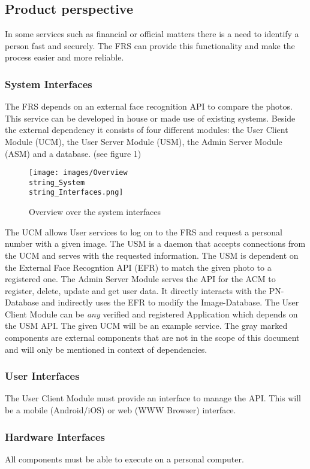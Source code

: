 \documentclass[a4paper,11pt]{article}
\begin{document}
\subsection{Product perspective}
In some services such as financial or official matters there is a need to identify a person fast and securely. The FRS can provide this functionality and make the process easier and more reliable.

\subsubsection{System Interfaces}
The FRS depends on an external face recognition API to compare the photos. This service can be developed in house or made use of existing systems. Beside the external dependency it consists of four different modules: the User Client Module (UCM), the User Server Module (USM), the Admin Server Module (ASM) and a database. (see figure 1)
\begin{figure}[h!]
	\centering
	\label{System Interfaces}
	\texttt{[image: images/Overview\\string\_System\\string\_Interfaces.png]} 
	\caption{Overview over the system interfaces}
\end{figure}
\newpage
\noindent
The UCM allows User services to log on to the FRS and request a personal number with a given image. The USM is a daemon that accepts connections from the UCM and serves with the requested information. The USM is dependent on the External Face Recogntion API (EFR) to match the given photo to a registered one. The Admin Server Module serves the API for the ACM to register, delete, update and get user data. It directly interacts with the PN-Database and indirectly uses the EFR to modify the Image-Database.
\newline
\noindent
The User Client Module can be \textit{any} verified and registered Application which depends on the USM API. The given UCM will be an example service. The gray marked components are external components that are not in the scope of this document and will only be mentioned in context of dependencies. 

\subsubsection{User Interfaces}
The User Client Module must provide an interface to manage the API. This will be a mobile (Android/iOS) or web (WWW Browser) interface. 
\subsubsection{Hardware Interfaces}
All components must be able to execute on a personal computer.
\end{document}
